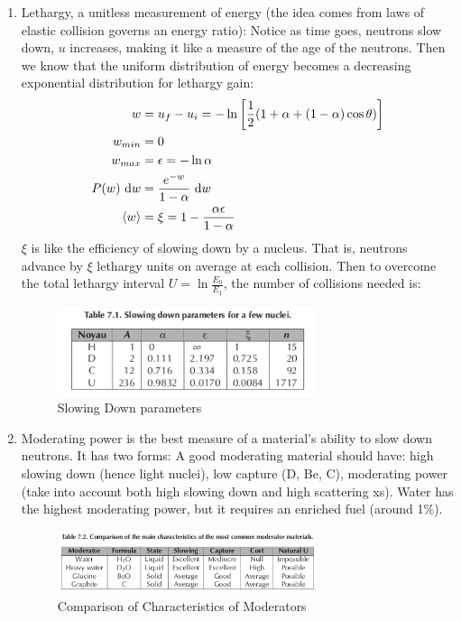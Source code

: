 \documentclass{school-22.211-notes}
\begin{document}
\begin{enumerate}
\item Lethargy, a unitless measurement of energy (the idea comes from laws of elastic collision governs an energy ratio):
Notice as time goes, neutrons slow down, $u$ increases, making it like a measure of the age of the neutrons. Then we know that the uniform distribution of energy becomes a decreasing exponential distribution for lethargy gain: 
\begin{align}
w &= u_f - u_i = -\ln \left[ \frac{1}{2} ( 1 + \alpha + (1-\alpha) \cos \theta ) \right] \\
w_{min} &= 0 \\
w_{max} &= \epsilon = -\ln \alpha \\
P(w) \mbox{ }\mathrm{d} w &= \frac{e^{-w}}{1 - \alpha} \mbox{ }\mathrm{d} w \\
\left< w \right> &= \xi = 1 - \frac{\alpha \epsilon}{1 - \alpha} 
\end{align}
$\xi$ is like the efficiency of slowing down by a nucleus. That is, neutrons advance by $\xi$ lethargy units on average at each collision. Then to overcome the total lethargy interval $U = \ln \frac{E_0}{E_1}$, the number of collisions needed is:
\begin{figure}
  \centering
  \includegraphics[width=3in]{images/slowing-down-parameter.png}
  \caption{Slowing Down parameters}
\end{figure}

\item Moderating power is the best measure of a material's ability to slow down neutrons. It has two forms:
A good moderating material should have: high slowing down (hence light nuclei), low capture (D, Be, C), moderating power (take into account both high slowing down and high scattering xs). Water has the highest moderating power, but it requires an enriched fuel (around 1\%). 
\begin{figure}
  \centering
  \includegraphics[width=3in]{images/moderator-comparison.png}
  \caption{Comparison of Characteristics of Moderators}
\end{figure}


\end{enumerate}
\end{document}
